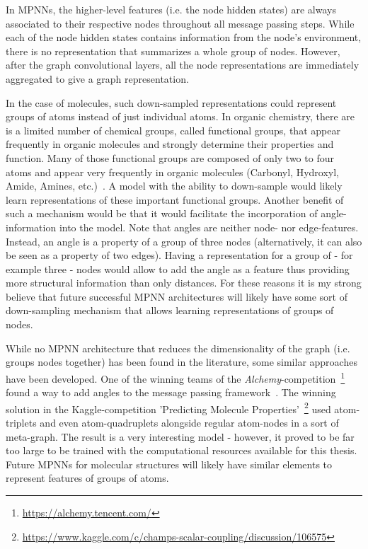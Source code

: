 In MPNNs, the higher-level features (i.e. the node hidden states) are always associated to their respective nodes throughout all message passing steps. While each of the node hidden states contains information from the node's environment, there is no representation that summarizes a whole group of nodes. However, after the graph convolutional layers, all the node representations are immediately aggregated to give a graph representation.

In the case of molecules, such down-sampled representations could represent groups of atoms instead of just individual atoms. In organic chemistry, there are is a limited number of chemical groups, called functional groups, that appear frequently in organic molecules and strongly determine their properties and function. Many of those functional groups are composed of only two to four atoms and appear very frequently in organic molecules (Carbonyl, Hydroxyl, Amide, Amines, etc.)~\cite{Organic-chemistry}. A model with the ability to down-sample would likely learn representations of these important functional groups. Another benefit of such a mechanism would be that it would facilitate the incorporation of angle-information into the model. Note that angles are neither node- nor edge-features. Instead, an angle is a property of a group of three nodes (alternatively, it can also be seen as a property of two edges). Having a representation for a group of - for example three - nodes would allow to add the angle as a feature thus providing more structural information than only distances. For these reasons it is my strong believe that future successful MPNN architectures will likely have some sort of down-sampling mechanism that allows learning representations of groups of nodes.

While no MPNN architecture that reduces the dimensionality of the graph (i.e. groups nodes together) has been found in the literature, some similar approaches have been developed. One of the winning teams of the \textit{Alchemy}-competition~\footnote{\url{https://alchemy.tencent.com/}} found a way to add angles to the message passing framework~\cite{Klicpera2019}. The winning solution in the Kaggle-competition 'Predicting Molecule Properties'~\footnote{\url{https://www.kaggle.com/c/champs-scalar-coupling/discussion/106575}} used atom-triplets and even atom-quadruplets alongside regular atom-nodes in a sort of meta-graph. The result is a very interesting model - however, it proved to be far too large to be trained with the computational resources available for this thesis. Future MPNNs for molecular structures will likely have similar elements to represent features of groups of atoms.

